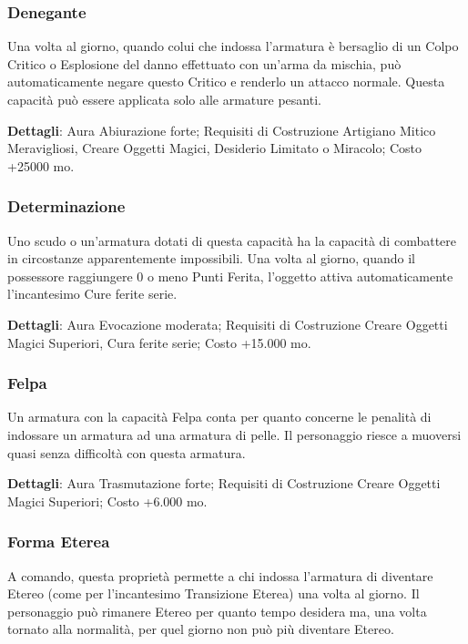 \begin{multicols}{2}
\subsubsection{Denegante}

Una volta al giorno, quando colui che indossa l'armatura è bersaglio di un Colpo Critico o Esplosione del danno effettuato con un'arma da mischia, può automaticamente negare questo Critico e renderlo un attacco normale. Questa capacità può essere applicata solo alle armature pesanti.

\textbf{Dettagli}: Aura Abiurazione forte; Requisiti di Costruzione Artigiano Mitico Meravigliosi, Creare Oggetti Magici, Desiderio Limitato o Miracolo; Costo +25000 mo.

\subsubsection{Determinazione}

Uno scudo o un'armatura dotati di questa capacità ha la capacità di combattere in circostanze apparentemente impossibili. Una volta al giorno, quando il possessore raggiungere 0 o meno Punti Ferita, l'oggetto attiva automaticamente l'incantesimo Cure ferite serie.

\textbf{Dettagli}: Aura Evocazione moderata; Requisiti di Costruzione Creare Oggetti Magici Superiori, Cura ferite serie; Costo +15.000 mo.

\subsubsection{Felpa}

Un armatura con la capacità Felpa conta per quanto concerne le penalità di indossare un armatura ad una armatura di pelle. Il personaggio riesce a muoversi quasi senza difficoltà con questa armatura.

\textbf{Dettagli}: Aura Trasmutazione forte; Requisiti di Costruzione Creare Oggetti Magici Superiori; Costo +6.000 mo.

\subsubsection{Forma Eterea}

A comando, questa proprietà permette a chi indossa l'armatura di diventare Etereo (come per l'incantesimo Transizione Eterea) una volta al giorno. Il personaggio può rimanere Etereo per quanto tempo desidera ma, una volta tornato alla normalità, per quel giorno non può più diventare Etereo.


\end{multicols}
